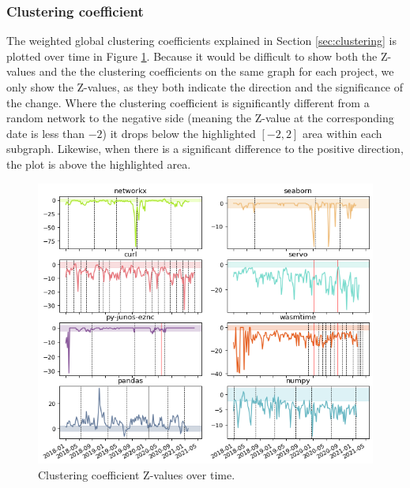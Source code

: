 \subsubsection{Clustering coefficient}

The weighted global clustering coefficients explained in Section \ref{sec:clustering} is plotted over time in Figure \ref{fig:clust}. Because it would be difficult to show both the Z-values and the the clustering coefficients on the same graph for each project, we only show the Z-values, as they both indicate the direction and the significance of the change. Where the clustering coefficient is significantly different from a random network to the negative side (meaning the Z-value at the corresponding date is less than $-2$) it drops below the highlighted $[-2, 2]$ area within each subgraph. Likewise, when there is a significant difference to the positive direction, the plot is above the highlighted area.

\begin{figure}
    \centering
    \includegraphics[width=\textwidth]{figures/qualitative/clustering_coeff/clustering_z.png}
    \caption{Clustering coefficient Z-values over time.}
    \label{fig:clust}
\end{figure}

